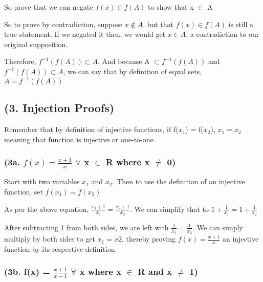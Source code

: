 \documentclass{article}
\begin{document}
\noindent So prove that we can negate $f(x) \in f(A)$ to show that x $\in$ A \par\vspace{0.5cm}

\noindent So to prove by contradiction, suppose $x \notin A$, but that $f(x) \in f(A)$ is still a true statement.  If we negated it then, we would get $x \in A$, a contradiction to our original supposition. \par\vspace{0.5cm}

\noindent Therefore, $f^{-1}(f(A)) \subset A$.  And because A $\subset f^{-1}(f(A))$ and $f^{-1}(f(A)) \subset A$, we can say that by definition of equal sets, $A = f^{-1}(f(A))$

\subsection{(3. Injection Proofs)}

Remember that by definition of injective functions, if f($x_{1}$) = f($x_{2}$), $x_{1} = x_{2}$ meaning that function is injective or one-to-one

\subsubsection{(3a. $f(x) = \frac{x + 1}{x}$  $\forall$ x $\in$ R  where x $\neq$ 0)}

\noindent Start with two variables $x_{1}$ and $x_{2}$.  Then to use the definition of an injective function, set $f(x_{1}) = f(x_{2})$ \par\vspace{0.5cm}

\noindent As per the above equation, $\frac{x_{1} + 1}{x_{1}} = \frac{x_{2} + 1}{x_{2}}$.  We can simplify that to $1 + \frac{1}{x_{1}} = 1 + \frac{1}{x_{2}}$ \par\vspace{0.5cm}

\noindent After subtracting 1 from both sides, we are left with $\frac{1}{x_{1}} = \frac{1}{x_{2}}$.  We can simply multiply by both sides to get $x_{1} = x{2}$, thereby proving $f(x) = \frac{x + 1}{x}$ an injective function by its respective definition.

\subsubsection{(3b. f(x) = $\frac{x + 1}{x - 1}$ $\forall$ x where x $\in$ R and x $\neq$ 1)}
\end{document}
